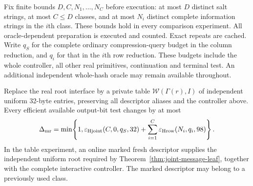 Fix finite bounds $D,C,N_1,\ldots,N_C$ before execution: at most $D$ distinct
salt strings, at most $C\le D$ classes, and at most $N_i$ distinct complete
information strings in the $i$th class. These bounds hold in every comparison
experiment. All oracle-dependent preparation is executed and counted. Exact
repeats are cached. Write $q_S$ for the complete ordinary compression-query
budget in the column reduction, and $q_i$ for that in the $i$th row reduction.
These budgets include the whole controller, all other real primitives,
continuation and terminal test. An additional independent whole-hash oracle
may remain available throughout.

\begin{theorem}
\label{thm:multiple-root-entry}
Replace the real root interface by a private table
$\mathcal W(\Gamma(r),I)$ of independent uniform 32-byte entries, preserving
all descriptor aliases and the controller above. Every efficient available
output-bit test changes by at most
\begin{equation}
 \Delta_{\rm mr}=\min\!\left\{1,
 \varepsilon_{\rm Hjoint}(C,0,q_S,32)
 +\sum_{i=1}^{C}\varepsilon_{\rm Hrow}(N_i,q_i,98)\right\}.
 \label{eq:multiple-root-error}
\end{equation}
In the table experiment, an online marked fresh descriptor supplies the
independent uniform root required by
Theorem~\ref{thm:joint-message-leaf}, together with the complete interactive
controller. The marked descriptor may belong to a previously used class.
\end{theorem}
